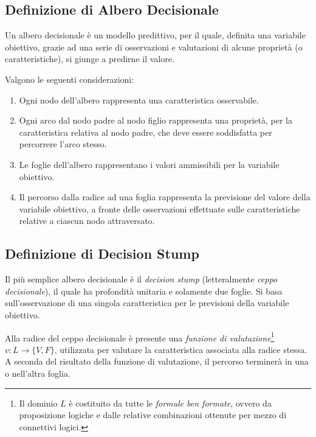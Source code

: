         \subsection{Definizione di Albero Decisionale}
        Un albero decisionale è un modello predittivo, per il quale, definita una variabile obiettivo, grazie ad una serie di osservazioni e valutazioni di alcune proprietà (o caratteristiche), si giunge a predirne il valore.

        Valgono le seguenti considerazioni:
        \begin{enumerate}
            \item Ogni nodo dell'albero rappresenta una caratteristica osservabile.
            \item Ogni arco dal nodo padre al nodo figlio rappresenta una proprietà, per la caratteristica relativa al nodo padre, che deve essere soddisfatta per percorrere l'arco stesso.
            \item Le foglie dell'albero rappresentano i valori ammissibili per la variabile obiettivo.
            \item Il percorso dalla radice ad una foglia rappresenta la previsione del valore della variabile obiettivo, a fronte delle osservazioni effettuate sulle caratteristiche relative a ciascun nodo attraversato.
        \end{enumerate}

        \subsection{Definizione di Decision Stump}
            Il più semplice albero decisionale è il \emph{decision stump} (letteralmente \emph{ceppo decisionale}), il quale ha profondità unitaria e solamente due foglie.
            Si basa sull'osservazione di una singola caratteristica per le previsioni della variabile obiettivo.


            Alla radice del ceppo decisionale è presente una \emph{funzione di valutazione}\footnote{Il dominio $L$ è costituito da tutte le \emph{formule ben formate}, ovvero da proposizione logiche e dalle relative combinazioni ottenute per mezzo di connettivi logici.} $v:L \rightarrow \{V, F\}$, utilizzata per valutare la caratteristica associata alla radice stessa.
            A seconda del risultato della funzione di valutazione, il percorso terminerà in una o nell'altra foglia.

